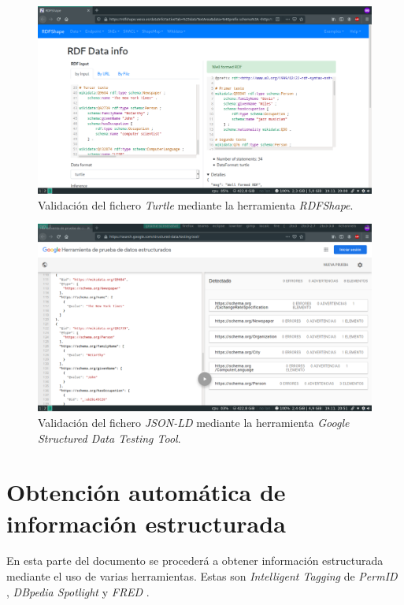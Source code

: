 \documentclass[11pt]{article}
\begin{document}
\begin{figure}[h]
\caption{Validación del fichero \textit{Turtle} mediante la herramienta \textit{RDFShape}.}
\centering
\includegraphics[width=\textwidth]{weso_turtle}
\end{figure}

\begin{figure}[h]
\caption{Validación del fichero \textit{JSON-LD} mediante la herramienta \textit{Google Structured Data Testing Tool}.}
\centering
\includegraphics[width=\textwidth]{google_jsonld}
\end{figure}
\section{Obtención automática de información estructurada}
En esta parte del documento se procederá a obtener información estructurada mediante el uso de varias herramientas. Estas son \textit{Intelligent Tagging} de \textit{PermID} \cite{permid}, \textit{DBpedia Spotlight} \cite{dbpedia} y \textit{FRED} \cite{fred}.
\end{document}
